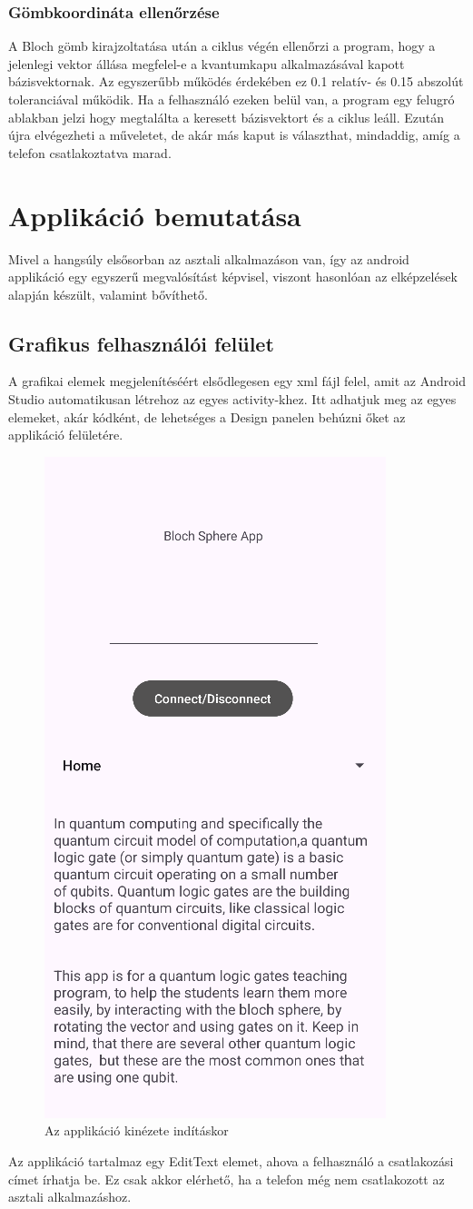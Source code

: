 \documentclass[
]{thesis-ekf}
\theoremstyle{definition}
\theoremstyle{remark}
\begin{document}
\subsubsection{Gömbkoordináta ellenőrzése}
A Bloch gömb kirajzoltatása után a ciklus végén ellenőrzi a program, hogy a jelenlegi vektor állása megfelel-e a kvantumkapu alkalmazásával kapott bázisvektornak. Az egyszerűbb működés érdekében ez 0.1 relatív- és 0.15 abszolút toleranciával működik. Ha a felhasználó ezeken belül van, a program egy felugró ablakban jelzi hogy megtalálta a keresett bázisvektort és a ciklus leáll. Ezután újra elvégezheti a műveletet, de akár más kaput is választhat, mindaddig, amíg a telefon csatlakoztatva marad.

\section{Applikáció bemutatása}
Mivel a hangsúly elsősorban az asztali alkalmazáson van, így az android applikáció egy egyszerű megvalósítást képvisel, viszont hasonlóan az elképzelések alapján készült, valamint bővíthető.

\subsection{Grafikus felhasználói felület}
A grafikai elemek megjelenítéséért elsődlegesen egy xml fájl felel, amit az Android Studio automatikusan létrehoz az egyes activity-khez. Itt adhatjuk meg az egyes elemeket, akár kódként, de lehetséges a Design panelen behúzni őket az applikáció felületére.

\begin{figure}[H]
	\centering
	\includegraphics[width=0.25\linewidth]{app}
	\caption{Az applikáció kinézete indításkor}
	\label{fig:app}
\end{figure}

Az applikáció tartalmaz egy EditText elemet, ahova a felhasználó a csatlakozási címet írhatja be. Ez csak akkor elérhető, ha a telefon még nem csatlakozott az asztali alkalmazáshoz.
\end{document}
